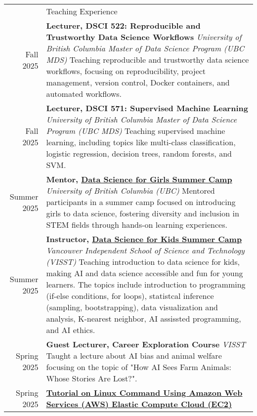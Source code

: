 \documentclass[letterpaper, 11pt]{article}
\newcommand{\headingfont}{\Large\color{OliveGreen}}
\newenvironment{SectionTable}[1]{
	\renewcommand*{\arraystretch}{1.7}
	\setlength{\tabcolsep}{10pt}
	\begin{longtable}{Rp{5.2in}} & #1 \\}
{\end{longtable}\vspace{-.3cm}}
\begin{document}
\begin{SectionTable}{\headingfont Teaching Experience}
Fall 2025 & 
\textbf{Lecturer, DSCI 522: Reproducible and Trustworthy Data Science Workflows} \newline 
\textit{University of British Columbia Master of Data Science Program (UBC MDS)}\newline
Teaching reproducible and trustworthy data science workflows, focusing on reproducibility, project management, version control, Docker containers, and automated workflows. \\
Fall 2025 & 
\textbf{Lecturer, DSCI 571: Supervised Machine Learning} \newline 
\textit{University of British Columbia Master of Data Science Program (UBC MDS)}\newline
Teaching supervised machine learning, including topics like multi-class classification, logistic regression, decision trees, random forests, and SVM. \\
Summer 2025 & 
\textbf{Mentor, \href{https://katieburak.github.io/girls-in-DS/README.html}{Data Science for Girls Summer Camp}} \newline 
\textit{University of British Columbia (UBC)}\newline
Mentored participants in a summer camp focused on introducing girls to data science, fostering diversity and inclusion in STEM fields through hands-on learning experiences. \\
Summer 2025 & 
\textbf{Instructor, \href{http://www.skysheng.io/data_science_for_kids/}{Data Science for Kids Summer Camp}} \newline 
\textit{Vancouver Independent School of Science and Technology (VISST)}\newline
Teaching introduction to data science for kids, making AI and data science accessible and fun for young learners. The topics include introduction to programming (if-else conditions, for loops), statistcal inference (sampling, bootstrapping), data visualization and analysis, K-nearest neighbor, AI assissted programming, and AI ethics.\\
Spring 2025 & 
\textbf{Guest Lecturer, Career Exploration Course} \newline 
\textit{VISST}\newline
Taught a lecture about AI bias and animal welfare focusing on the topic of "How AI Sees Farm Animals: Whose Stories Are Lost?". \\
Spring 2025 & 
\textbf{\href{https://github.com/skysheng7/linux_command_in_aws_ec2.git}{Tutorial on Linux Command Using Amazon Web Services (AWS) Elastic Compute Cloud (EC2)}} \newline 

\end{SectionTable}
\end{document}
